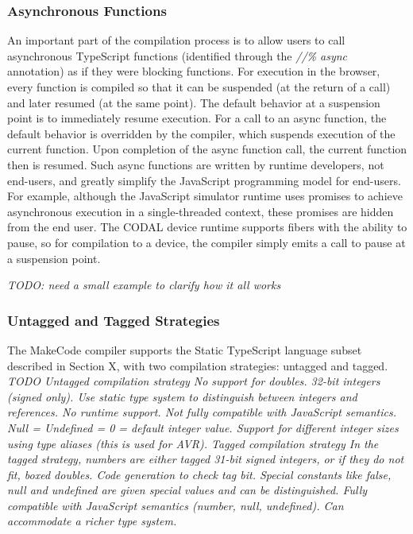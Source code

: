 \subsubsection{Asynchronous Functions}

An important part of the compilation process is to allow users to call asynchronous 
TypeScript functions (identified through the \emph{//\% async} annotation) as if they were blocking functions.  
For execution in the browser,
every function is compiled so that it can be suspended (at the return of a call) and later resumed (at the same point). 
The default behavior at a suspension point is to immediately resume execution.  For a call to an async function,
the default behavior is overridden by the compiler, which suspends execution of the current function. 
Upon completion of the async function call, the current function then is resumed. Such async functions are written
by runtime developers, not end-users, and greatly simplify the JavaScript
programming model for end-users. For example, although the JavaScript simulator runtime uses promises to 
achieve asynchronous execution in a single-threaded context, these promises are hidden from the end user. 
The CODAL device runtime supports fibers with the ability to pause, so for compilation to a device, 
the compiler simply emits a call to pause at a suspension point. 

\emph{TODO: need a small example to clarify how it all works}


\subsubsection{Untagged and Tagged Strategies}

The MakeCode compiler supports the Static TypeScript language subset described in Section X, with two compilation
strategies: untagged and tagged. 
\emph{TODO
Untagged compilation strategy
No support for doubles. 32-bit integers (signed only). Use static type system to distinguish between integers and references.
No runtime support.  Not fully compatible with JavaScript semantics. Null = Undefined = 0 = default integer value.  Support for
different integer sizes using type aliases (this is used for AVR). 
Tagged compilation strategy
In the tagged strategy, numbers are either tagged 31-bit signed integers, or if they do not fit, boxed doubles. Code generation
to check tag bit. Special constants like false, null and undefined are given special values and can be distinguished. Fully
compatible with JavaScript semantics (number, null, undefined).   Can accommodate a richer type system.}

